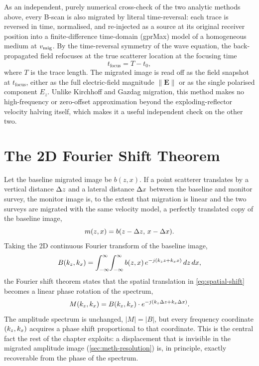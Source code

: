 As an independent, purely numerical cross-check of the two analytic methods
above, every B-scan is also migrated by literal time-reversal: each trace is
reversed in time, normalised, and re-injected as a source at its original
receiver position into a finite-difference time-domain (gprMax) model of a
homogeneous medium at $v_{\mathrm{mig}}$. By the time-reversal symmetry of the wave
equation, the back-propagated field refocuses at the true scatterer location
at the focusing time
\begin{equation}
  t_{\mathrm{focus}} = T - t_0 ,
  \label{eq:backprop-focus}
\end{equation}
where $T$ is the trace length. The migrated image is read off as the field
snapshot at $t_{\mathrm{focus}}$, either as the full electric-field magnitude
$\lVert\mathbf{E}\rVert$ or as the single polarised component $E_z$. Unlike
Kirchhoff and Gazdag migration, this method makes no high-frequency or
zero-offset approximation beyond the exploding-reflector velocity halving
itself, which makes it a useful independent check on the other two.

\section{The 2D Fourier Shift Theorem}
\label{sec:th-fourier-shift}

Let the baseline migrated image be $b(z,x)$. If a point scatterer
translates by a vertical distance $\Delta z$ and a lateral distance $\Delta x$ between
the baseline and monitor survey, the monitor image is, to the extent that
migration is linear and the two surveys are migrated with the same velocity
model, a perfectly translated copy of the baseline image,
\begin{equation}
  m(z,x) = b(z - \Delta z,\, x - \Delta x).
  \label{eq:spatial-shift}
\end{equation}
Taking the 2D continuous Fourier transform of the baseline image,
\begin{equation}
  B(k_z,k_x) = \int_{-\infty}^{\infty}\!\int_{-\infty}^{\infty}
    b(z,x)\, e^{-j(k_z z + k_x x)}\, dz\, dx,
  \label{eq:2d-fourier}
\end{equation}
the Fourier shift theorem states that the spatial translation in
\cref{eq:spatial-shift} becomes a linear phase rotation of the spectrum,
\begin{equation}
  M(k_z,k_x) = B(k_z,k_x)\cdot e^{-j(k_z \Delta z + k_x \Delta x)}.
  \label{eq:fourier-shift-theorem}
\end{equation}
The amplitude spectrum is unchanged, $|M|=|B|$, but every frequency
coordinate $(k_z,k_x)$ acquires a phase shift proportional to that
coordinate. This is the central fact the rest of the chapter exploits: a
displacement that is invisible in the migrated amplitude image
(\cref{sec:meth-resolution}) is, in principle, exactly recoverable from the phase of
the spectrum.

